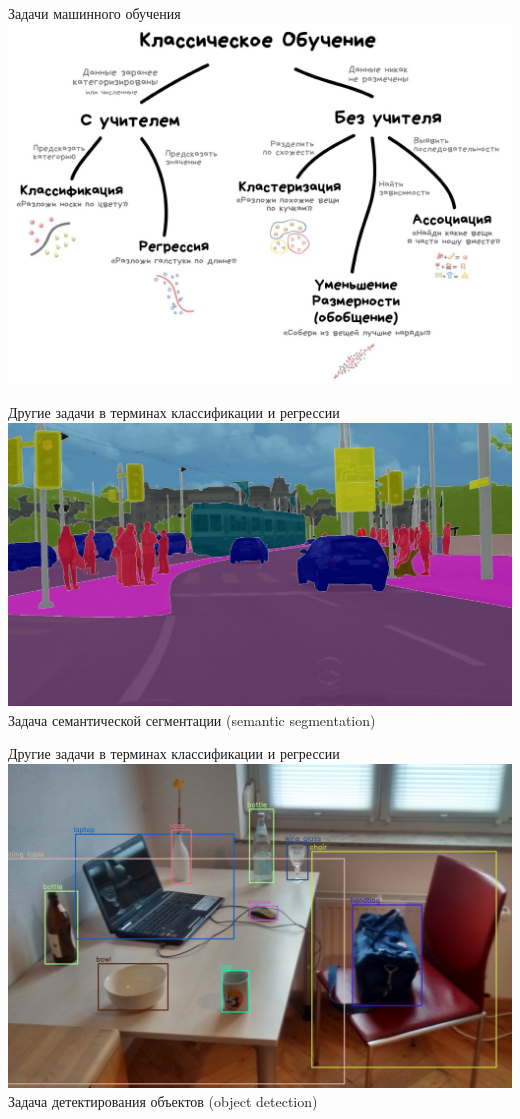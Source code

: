 \documentclass[aspectratio=169, professionalfonts]{beamer}
\begin{document}
\begin{frame}{Задачи машинного обучения}
    \centering
    \includegraphics[width=.67\linewidth]{figures/fig5-supervised-learning.jpg}
\end{frame}

\begin{frame}{Другие задачи в терминах классификации и регрессии}
    \centering
    \includegraphics[width=.78\linewidth]{figures/fig6-segmentation.jpg} \\
    Задача семантической сегментации (semantic segmentation)
\end{frame}

\begin{frame}{Другие задачи в терминах классификации и регрессии}
    \centering
    \includegraphics[width=.68\linewidth]{figures/fig7-object-detection.jpg} \\
    Задача детектирования объектов (object detection)
\end{frame}
\end{document}
